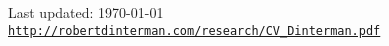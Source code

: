 \documentclass[letterpaper]{article}
\def\footerlink{http://robertdinterman.com/research/CV_Dinterman.pdf}
\renewenvironment{itemize}{
  \begin{list}{}{
    \setlength{\leftmargin}{1.5em}
  }
}{
  \end{list}
}
\begin{document}

\bigskip

\begin{center}
  \begin{footnotesize}
    Last updated: \today \\
    \href{\footerlink}{\texttt{http://robertdinterman.com/research/CV\_Dinterman.pdf}}
  \end{footnotesize}
\end{center}
\end{document}
